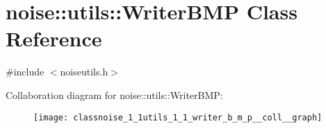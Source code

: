 \hypertarget{classnoise_1_1utils_1_1_writer_b_m_p}{\section{noise\+:\+:utils\+:\+:Writer\+B\+M\+P Class Reference}
\label{classnoise_1_1utils_1_1_writer_b_m_p}
}


{\ttfamily \#include $<$noiseutils.\+h$>$}



Collaboration diagram for noise\+:\+:utils\+:\+:Writer\+B\+M\+P\+:\nopagebreak
\begin{figure}[H]
\begin{center}
\leavevmode
\texttt{[image: classnoise\_1\_1utils\_1\_1\_writer\_b\_m\_p\_\_coll\_\_graph]}
\end{center}
\end{figure}
